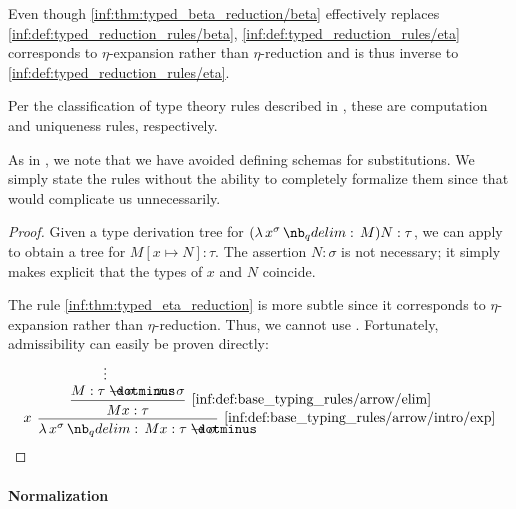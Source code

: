 \begin{comments}
  \item Even though \ref{inf:thm:typed_beta_reduction/beta} effectively replaces \ref{inf:def:typed_reduction_rules/beta}, \ref{inf:def:typed_reduction_rules/eta} corresponds to \( \eta \)-expansion rather than \( \eta \)-reduction and is thus inverse to \ref{inf:def:typed_reduction_rules/eta}.

  \item Per the classification of type theory rules described in , these are computation and uniqueness rules, respectively.

  \item As in , we note that we have avoided defining schemas for substitutions. We simply state the rules without the ability to completely formalize them since that would complicate us unnecessarily.
\end{comments}
\begin{proof}
  Given a type derivation tree for \( (\qabs {x^\sigma} M) N: \tau \), we can apply  to obtain a tree for \( M[x \mapsto N]: \tau \). The assertion \( N: \sigma \) is not necessary; it simply makes explicit that the types of \( x \) and \( N \) coincide.

  The rule \ref{inf:thm:typed_eta_reduction} is more subtle since it corresponds to \( \eta \)-expansion rather than \( \eta \)-reduction. Thus, we cannot use . Fortunately, admissibility can easily be proven directly:
  \begin{equation*}
    \begin{prooftree}
      \hypo{}
      \ellipsis {} { M: \tau \synimplies \sigma }
      \hypo{ x: \sigma }

      \infer2[\ref{inf:def:base_typing_rules/arrow/elim}]{ Mx: \tau }

      \infer[left label=\( x \)]1[\ref{inf:def:base_typing_rules/arrow/intro/exp}]{ \qabs {x^\sigma} Mx: \tau \synimplies \sigma }
    \end{prooftree}
  \end{equation*}
\end{proof}

\paragraph{Normalization}

\begin{definition}\label{def:lambda_term_strong_normalization}
\end{definition}
